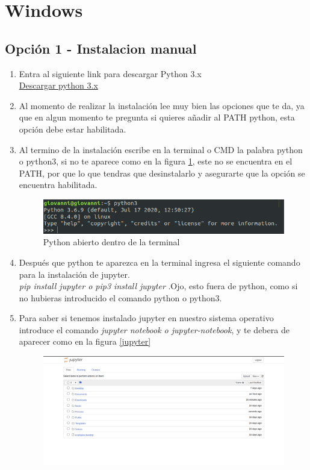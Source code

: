 \documentclass[12pt,letterpaper]{report}
\begin{document}
\section*{Windows}
\subsection*{Opci\'on 1 - Instalacion manual}
\begin{enumerate}
    \item Entra al siguiente link para descargar Python 3.x \\
    \href{https://www.python.org/downloads/release/python-385/}{Descargar python 3.x}
    \item Al momento de realizar la instalaci\'on lee muy bien las opciones que te da, ya que en algun momento te pregunta si quieres a\~nadir al PATH python, esta opci\'on debe estar habilitada.
    \item Al termino de la instalaci\'on escribe en la terminal o CMD la palabra python o python3, si no te aparece como en la figura \ref{python-terminal}, este no se encuentra en el PATH, por que lo que tendras que desinstalarlo y asegurarte que la opci\'on se encuentra habilitada.
    \begin{figure}[H]
        \includegraphics[scale=0.7]{images/python-print.png}
        \caption{Python abierto dentro de la terminal}
        \label{python-terminal}
    \end{figure}
    \item Despu\'es que python te aparezca en la terminal ingresa el siguiente comando para la instalaci\'on de jupyter.\\
    \textit{pip install jupyter o pip3 install jupyter} .Ojo, esto fuera de python, como si no hubieras introducido el comando python o python3.
    \item Para saber si tenemos instalado jupyter en nuestro sistema operativo introduce el comando \textit{jupyter notebook o jupyter-notebook}, y te debera de aparecer como en la figura \ref{jupyter}
    \begin{figure}[H]
        \includegraphics[scale=0.3]{images/jupyter.png}

\end{figure}
\end{enumerate}
\end{document}
